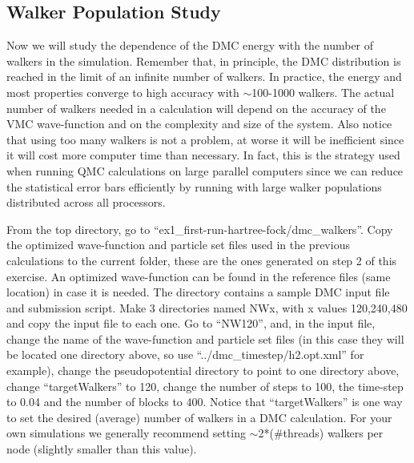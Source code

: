 \subsection{Walker Population Study}
Now we will study the dependence of the DMC energy with the number of walkers in the
simulation. Remember that, in principle, the DMC distribution is reached in the limit of
an infinite number of walkers. In practice, the energy and most properties converge to high
accuracy with $\sim$100-1000 walkers. The actual number of walkers needed in a calculation
will depend on the accuracy of the VMC wave-function and on the complexity and size of
the system. Also notice that using too many walkers is not a problem, at worse it will be
inefficient since it will cost more computer time than necessary. In fact, this is the strategy
used when running QMC calculations on large parallel computers since we can reduce the
statistical error bars efficiently by running with large walker populations distributed across
all processors.

From the top directory, go to ``ex1\_first-run-hartree-fock/dmc\_walkers''. Copy the
optimized wave-function and particle set files used in the previous calculations to the current
folder, these are the ones generated on step 2 of this exercise. An optimized wave-function can be found in the reference files (same location) in case it is needed. The directory
contains a sample DMC input file and submission script. Make 3 directories named NWx,
with x values 120,240,480 and copy the input file to each one. Go
to ``NW120'', and, in the input file, change the name of the wave-function and particle set
files (in this case they will be located one directory above, so use ``../dmc\_timestep/h2.opt.xml'' for
example), change the pseudopotential directory to point to one directory above, change ``targetWalkers'' to 120, change the number of steps to 100, the time-step
to 0.04 and the number of blocks to 400. Notice that ``targetWalkers'' is one way to set the
desired (average) number of walkers in a DMC calculation.   For your own simulations we generally recommend setting $\sim$2*(\#threads)
walkers per node (slightly smaller than this value).


